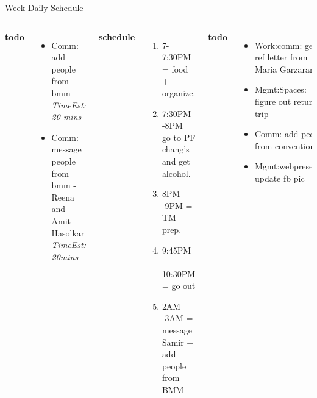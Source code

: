 \documentclass[serif, mathserif, final]{beamer}
\newcommand{\te}[1]{\textit{TimeEst:} \textit{#1}}
\begin{document}
\begin{frame}{}
\begin{columns}
\begin{column}{0.50\linewidth}
\begin{block}{Week Daily Schedule}
\begin{columns}
          \textbf{\small todo}\\
          \begin{itemize} 
          \item \tiny Comm: add people from bmm \te{20 mins} 
          \item \tiny Comm: message people from bmm - Reena and Amit
            Hasolkar  \te{20mins} 
          \end{itemize}
          \textbf{\small schedule}\\ 
          \begin{enumerate}
            \tiny \item \tiny 7-7:30PM = food + organize.  
            \tiny \item \tiny 7:30PM -8PM = go to PF chang's and get
            alcohol. 
            \tiny \item \tiny 8PM -9PM = TM prep. 
            \tiny \item \tiny 9:45PM - 10:30PM = go out 
            \tiny \item \tiny 2AM -3AM =  message Samir + add people
            from BMM
          \end{enumerate}
          
          \textbf{\small todo}\\
          \begin{itemize} 
          \item \tiny Work:comm: get ref letter from Maria Garzaran 
          \item \tiny Mgmt:Spaces: figure out return trip  
          \item \tiny Comm: add people from convention 
          \item \tiny Mgmt:webpresence: update fb pic 
            
          \end{itemize}
          \textbf{\small schedule}\\
          \begin{enumerate} 
            \tiny \item \tiny 
          \end{enumerate} 
        \end{columns}
      \end{block}
    \end{column}%
    

\end{columns}
\end{frame}
\end{document}
